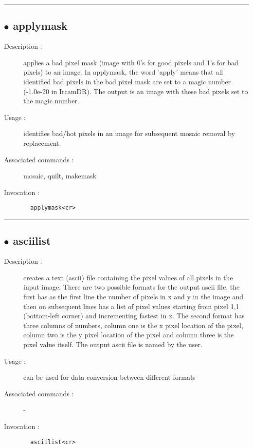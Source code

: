 \hrule \subsection*{$\bullet$ applymask}
\begin{description}
\item[Description :] applies a bad pixel mask (image with 0's for good pixels and
1's for bad pixels) to an image.  In applymask, the word 'apply' means that
all identified bad pixels in the bad pixel mask are set to a magic number
(-1.0e-20 in IrcamDR).  The output is an image with these bad pixels set
to the magic number.
\item[Usage :] identifies bad/hot pixels in an image for subsequent mosaic
removal by replacement.
\item[Associated commands :] mosaic, quilt, makemask
\item[Invocation :]

\verb+  applymask<cr> +\end{description}

\hrule \subsection*{$\bullet$ asciilist}
\begin{description}
\item[Description :] creates a text (ascii) file containing the pixel values of
all pixels in the input image.  There are two possible formats for the
output ascii file, the first has as the first line the number of pixels
in x and y in the image and then on subsequent lines has a list of pixel
values starting from pixel 1,1 (bottom-left corner) and incrementing
fastest in x.  The second format has three columns of numbers, column one
is the x pixel location of the pixel, column two is the y pixel location
of the pixel and column three is the pixel value itself.  The output
ascii file is named by the user.
\item[Usage :] can be used for data conversion between different formats
\item[Associated commands :] -
\item[Invocation :]

\verb+  asciilist<cr> +\end{description}

